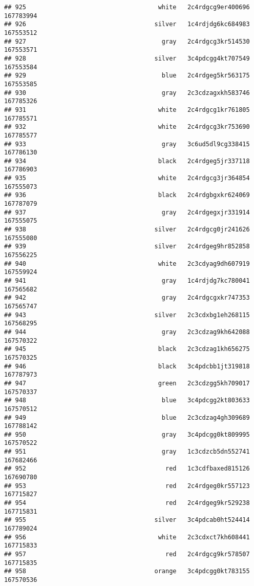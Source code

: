 \documentclass[
]{article}
\begin{document}
\begin{verbatim}
## 925                                    white   2c4rdgcg9er400696 167783994
## 926                                   silver   1c4rdjdg6kc684983 167553512
## 927                                     gray   2c4rdgcg3kr514530 167553571
## 928                                   silver   3c4pdcgg4kt707549 167553584
## 929                                     blue   2c4rdgeg5kr563175 167553585
## 930                                     gray   2c3cdzagxkh583746 167785326
## 931                                    white   2c4rdgcg1kr761805 167785571
## 932                                    white   2c4rdgcg3kr753690 167785577
## 933                                     gray   3c6ud5dl9cg338415 167786130
## 934                                    black   2c4rdgeg5jr337118 167786903
## 935                                    white   2c4rdgcg3jr364854 167555073
## 936                                    black   2c4rdgbgxkr624069 167787079
## 937                                     gray   2c4rdgegxjr331914 167555075
## 938                                   silver   2c4rdgcg0jr241626 167555080
## 939                                   silver   2c4rdgeg9hr852858 167556225
## 940                                    white   2c3cdyag9dh607919 167559924
## 941                                     gray   1c4rdjdg7kc780041 167565682
## 942                                     gray   2c4rdgcgxkr747353 167565747
## 943                                   silver   2c3cdxbg1eh268115 167568295
## 944                                     gray   2c3cdzag9kh642088 167570322
## 945                                    black   2c3cdzag1kh656275 167570325
## 946                                    black   3c4pdcbb1jt319818 167787973
## 947                                    green   2c3cdzgg5kh709017 167570337
## 948                                     blue   3c4pdcgg2kt803633 167570512
## 949                                     blue   2c3cdzag4gh309689 167788142
## 950                                     gray   3c4pdcgg0kt809995 167570522
## 951                                     gray   1c3cdzcb5dn552741 167682466
## 952                                      red   1c3cdfbaxed815126 167690780
## 953                                      red   2c4rdgeg0kr557123 167715827
## 954                                      red   2c4rdgeg9kr529238 167715831
## 955                                   silver   3c4pdcab0ht524414 167789024
## 956                                    white   2c3cdxct7kh608441 167715833
## 957                                      red   2c4rdgcg9kr578507 167715835
## 958                                   orange   3c4pdcgg0kt783155 167570536

\end{verbatim}
\end{document}
